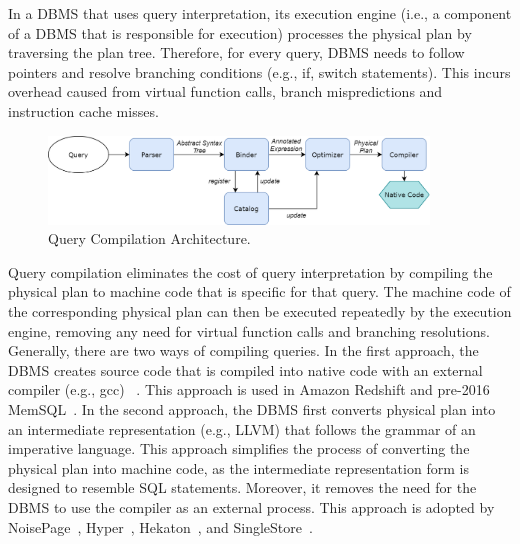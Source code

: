 \documentclass[12pt]{cmuthesis}
\begin{document}
In a DBMS that uses query interpretation, its execution engine (i.e., a component of a DBMS that is responsible for execution) processes the physical plan by traversing the plan tree. Therefore, for every query, DBMS needs to follow pointers and resolve branching conditions (e.g., if, switch statements). This incurs overhead caused from virtual function calls, branch mispredictions and instruction cache misses.

\begin{figure}[t!]
\centering
\includegraphics[width=0.9\textwidth]{images/QueryCompilation.png}
\caption{Query Compilation Architecture.}
\label{fig:query_compilation}
\end{figure}

Query compilation eliminates the cost of query interpretation by compiling the physical plan to machine code that is specific for that query. The machine code of the corresponding physical plan can then be executed repeatedly by the execution engine, removing any need for virtual function calls and branching resolutions. Generally, there are two ways of compiling queries. In the first approach, the DBMS creates source code that is compiled into native code with an external compiler (e.g., gcc) ~\cite{krikellas10, klonatos14}. This approach is used in Amazon Redshift and pre-2016 MemSQL~\cite{paroski16}. In the second approach, the DBMS first converts physical plan into an intermediate representation (e.g., LLVM) that follows the grammar of an imperative language. This approach simplifies the process of converting the physical plan into machine code, as the intermediate representation form is designed to resemble SQL statements. Moreover, it removes the need for the DBMS to use the compiler as an external process. This approach is adopted by NoisePage~\cite{menon17}, Hyper~\cite{neumann11}, Hekaton~\cite{craig14}, and SingleStore~\cite{paroski16}.
\end{document}
